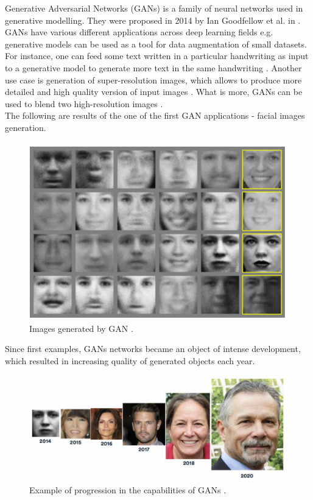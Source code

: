 \documentclass[11pt,a4paper,openany]{book}
\begin{document}
\noindent Generative Adversarial Networks (GANs) is a family of neural networks used in generative modelling. They were proposed in 2014 by Ian Goodfellow et al. in \cite{gan}.\\
\noindent GANs have various different applications across deep learning fields e.g. generative models can be used as a tool for data augmentation of small datasets. For instance, one can feed some text written in a particular handwriting as input to a generative model to generate more text in the same handwriting \cite{hand}. Another use case is generation of super-resolution images, which allows to produce more detailed and high quality version of input images \cite{superres}.  What is more, GANs can be used to blend two high-resolution images \cite{blend}. \\
The following are results of the one of the first GAN applications - facial images generation.
 \begin{figure}[ht!]
     \centering
     \includegraphics[scale=0.4]{figs/faces.png}
     \caption{Images generated by GAN \cite{gan}.}
 \end{figure}
 
 \newpage
\noindent Since first examples, GANs networks became an object of intense development, which resulted in increasing quality of generated objects each year.

 \begin{figure}[ht!]
     \centering
     \includegraphics[scale=0.8]{figs/gans_progress_new.PNG}
     \caption{Example of progression in the capabilities of GANs \cite{progress_gan}. }
 \end{figure}
 
\end{document}

